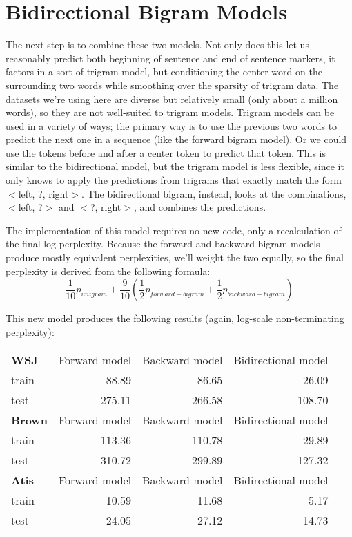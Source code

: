 \documentclass[10pt]{article}
\begin{document}
\section{Bidirectional Bigram Models}


The next step is to combine these two models. Not only does this let us reasonably predict both beginning of sentence and end of sentence markers, it factors in a sort of trigram model, but conditioning the center word on the surrounding two words while smoothing over the sparsity of trigram data. The datasets we're using here are diverse but relatively small (only about a million words), so they are not well-suited to trigram models. Trigram models can be used in a variety of ways; the primary way is to use the previous two words to predict the next one in a sequence (like the forward bigram model). Or we could use the tokens before and after a center token to predict that token. This is similar to the bidirectional model, but the trigram model is less flexible, since it only knows to apply the predictions from trigrams that exactly match the form $<$left, ?, right$>$. The bidirectional bigram, instead, looks at the combinations, $<$left, ?$>$ and $<$?, right$>$, and combines the predictions.

The implementation of this model requires no new code, only a recalculation of the final log perplexity. Because the forward and backward bigram models produce mostly equivalent perplexities, we'll weight the two equally, so the final perplexity is derived from the following formula:
\[
  \frac{1}{10}p_{unigram} + \frac{9}{10}\left(\frac{1}{2}p_{forward-bigram} + \frac{1}{2}p_{backward-bigram}\right)
\]

This new model produces the following results (again, log-scale non-terminating perplexity):

\medskip
\begin{tabular}{lrrr}
  \textbf{WSJ} & Forward model & Backward model & Bidirectional model \\
  train &  88.89 &  86.65 & 26.09 \\
  test  & 275.11 & 266.58 & 108.70 \\
  \midrule
  \textbf{Brown} & Forward model & Backward model & Bidirectional model \\
  train & 113.36 & 110.78 & 29.89 \\
  test  & 310.72 & 299.89 & 127.32 \\
  \midrule
  \textbf{Atis} & Forward model & Backward model & Bidirectional model \\
  train & 10.59 & 11.68 & 5.17 \\
  test  & 24.05 & 27.12 & 14.73 \\
\end{tabular}
\medskip
\end{document}
